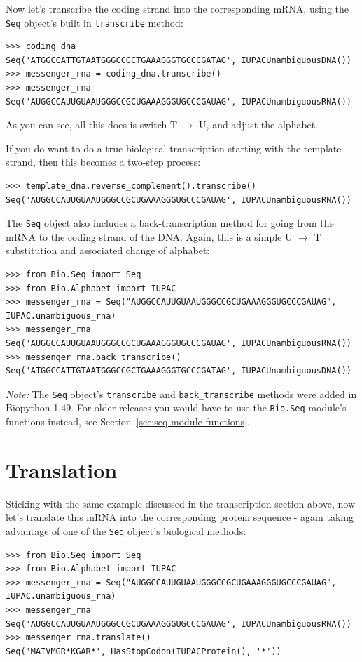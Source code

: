 \documentclass{report}
\begin{document}
Now let's transcribe the coding strand into the corresponding mRNA, using the \verb|Seq| object's built in \verb|transcribe| method:
\begin{verbatim}
>>> coding_dna
Seq('ATGGCCATTGTAATGGGCCGCTGAAAGGGTGCCCGATAG', IUPACUnambiguousDNA())
>>> messenger_rna = coding_dna.transcribe()
>>> messenger_rna
Seq('AUGGCCAUUGUAAUGGGCCGCUGAAAGGGUGCCCGAUAG', IUPACUnambiguousRNA())
\end{verbatim}
\noindent As you can see, all this does is switch T $\rightarrow$ U, and adjust the alphabet.

If you do want to do a true biological transcription starting with the template strand, then this becomes a two-step process:
\begin{verbatim}
>>> template_dna.reverse_complement().transcribe()
Seq('AUGGCCAUUGUAAUGGGCCGCUGAAAGGGUGCCCGAUAG', IUPACUnambiguousRNA())
\end{verbatim}

The \verb|Seq| object also includes a back-transcription method for going from the mRNA to the coding strand of the DNA.  Again, this is a simple U $\rightarrow$ T substitution and associated change of alphabet:
\begin{verbatim}
>>> from Bio.Seq import Seq
>>> from Bio.Alphabet import IUPAC
>>> messenger_rna = Seq("AUGGCCAUUGUAAUGGGCCGCUGAAAGGGUGCCCGAUAG", IUPAC.unambiguous_rna)
>>> messenger_rna
Seq('AUGGCCAUUGUAAUGGGCCGCUGAAAGGGUGCCCGAUAG', IUPACUnambiguousRNA())
>>> messenger_rna.back_transcribe()
Seq('ATGGCCATTGTAATGGGCCGCTGAAAGGGTGCCCGATAG', IUPACUnambiguousDNA())
\end{verbatim}

\emph{Note:} The \verb|Seq| object's \verb|transcribe| and \verb|back_transcribe| methods
were added in Biopython 1.49.  For older releases you would have to use the \verb|Bio.Seq|
module's functions instead, see Section~\ref{sec:seq-module-functions}.

\section{Translation}
\label{sec:translation}
Sticking with the same example discussed in the transcription section above,
now let's translate this mRNA into the corresponding protein sequence - again taking
advantage of one of the \verb|Seq| object's biological methods:

\begin{verbatim}
>>> from Bio.Seq import Seq
>>> from Bio.Alphabet import IUPAC
>>> messenger_rna = Seq("AUGGCCAUUGUAAUGGGCCGCUGAAAGGGUGCCCGAUAG", IUPAC.unambiguous_rna)
>>> messenger_rna
Seq('AUGGCCAUUGUAAUGGGCCGCUGAAAGGGUGCCCGAUAG', IUPACUnambiguousRNA())
>>> messenger_rna.translate()
Seq('MAIVMGR*KGAR*', HasStopCodon(IUPACProtein(), '*'))
\end{verbatim}
\end{document}
